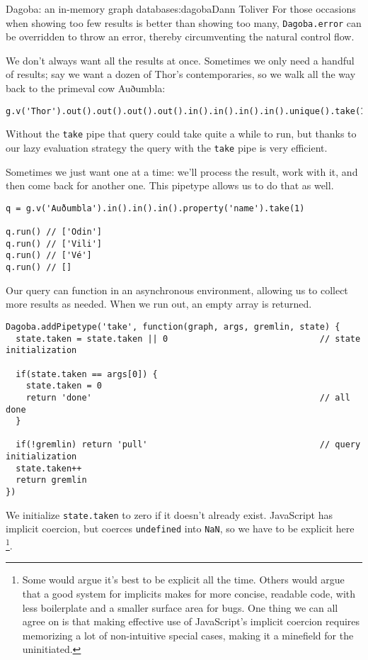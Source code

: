 \begin{aosachapter}{Dagoba: an in-memory graph database}{s:dagoba}{Dann Toliver}
For those occasions when showing too few results is better than showing
too many, \texttt{Dagoba.error} can be overridden to throw an error,
thereby circumventing the natural control flow.

\label{take}

We don't always want all the results at once. Sometimes we only need a
handful of results; say we want a dozen of Thor's contemporaries, so we
walk all the way back to the primeval cow Auðumbla:

\begin{verbatim}
g.v('Thor').out().out().out().out().in().in().in().in().unique().take(12).run()
\end{verbatim}

Without the \texttt{take} pipe that query could take quite a while to
run, but thanks to our lazy evaluation strategy the query with the
\texttt{take} pipe is very efficient.

Sometimes we just want one at a time: we'll process the result, work
with it, and then come back for another one. This pipetype allows us to
do that as well.

\begin{verbatim}
q = g.v('Auðumbla').in().in().in().property('name').take(1)

q.run() // ['Odin']
q.run() // ['Vili']
q.run() // ['Vé']
q.run() // []
\end{verbatim}

Our query can function in an asynchronous environment, allowing us to
collect more results as needed. When we run out, an empty array is
returned.

\begin{verbatim}
Dagoba.addPipetype('take', function(graph, args, gremlin, state) {
  state.taken = state.taken || 0                              // state initialization

  if(state.taken == args[0]) {
    state.taken = 0
    return 'done'                                             // all done
  }

  if(!gremlin) return 'pull'                                  // query initialization
  state.taken++
  return gremlin
})
\end{verbatim}

We initialize \texttt{state.taken} to zero if it doesn't already exist.
JavaScript has implicit coercion, but coerces \texttt{undefined} into
\texttt{NaN}, so we have to be explicit here \footnote{Some would argue
  it's best to be explicit all the time. Others would argue that a good
  system for implicits makes for more concise, readable code, with less
  boilerplate and a smaller surface area for bugs. One thing we can all
  agree on is that making effective use of JavaScript's implicit
  coercion requires memorizing a lot of non-intuitive special cases,
  making it a minefield for the uninitiated.}.


\end{aosachapter}
